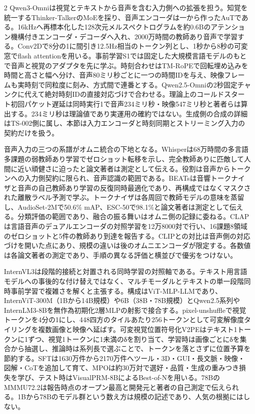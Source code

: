 \documentclass[lualatex,a4paper,10pt]{jlreq}
\begin{document}
\begin{multicols}{2}
\noindent Qwen3-Omniは視覚とテキストから音声を含む入力側への拡張を担う。知覚を統一するThinker-TalkerのMoEを採り、音声エンコーダは一から作ったAuTである。16kHzへ再標本化した128次元メルスペクトログラムを約0.6Bのアテンション機構付きエンコーダ・デコーダへ入れ、2000万時間の教師あり音声で学習する。Conv2Dで8分の1に間引き12.5Hz相当のトークン列とし、1秒から8秒の可変窓でflash attentionを用いる。事前学習S1では固定した大規模言語モデルのもとで音声と視覚のアダプタを先に学ぶ。時刻合わせはTM-RoPEで回転埋め込みを時間と高さと幅へ分け、音声80ミリ秒ごとに一つの時間IDを与え、映像フレームも実時刻で同粒度に刻み、方式間で連番とする。Qwen2.5-Omniの2秒固定チャンクに代えて絶対時刻IDの直接対応づけで合わせる。理論上のコールドスタート初回パケット遅延は同時実行1で音声234ミリ秒・映像547ミリ秒と著者らは算出する。234ミリ秒は理論値であり実運用の確約ではない。生成側の合成の詳細はTS-002側に属し、本節は入力エンコーダと時刻同期とストリーミング入力の契約だけを扱う。\autocite{vmd066}\par\medskip
\noindent 音声入力の三つの系譜がオムニ統合の下地となる。Whisperは68万時間の多言語多課題の弱教師あり学習でゼロショット転移を示し、完全教師ありに匹敵して人間に近い頑健さに迫ったと論文著者は測定として伝える。役割は音声からトークンへの入力側契約に限られ、音声認識の範囲である。BEATsは音響トークナイザと音声の自己教師あり学習の反復同時最適化であり、再構成ではなくマスクされた離散ラベル予測で学ぶ。トークナイザは各周回で教師モデルの意味を蒸留し、AudioSet-2Mで50.6\% mAP、ESC-50で98.1\%と論文著者は測定として伝える。分類評価の範囲であり、融合の振る舞いはオムニ側の記録に委ねる。CLAPは言語音声のデュアルエンコーダの対照学習を12万8000対で行い、16課題8領域のゼロショットと5件の教師あり到達を報告する。CLIPとの対比は音声側の対応づけを開いた点にあり、規模の違いは後のオムニエンコーダが限定する。各数値は各論文著者の測定であり、手順の異なる評価と横並びで優劣をつけない。\autocite{vmd067,vmd068,vmd069}\par\medskip
\noindent InternVL3は段階的接続と対置される同時学習の対照軸である。テキスト用言語モデルへの事後的な付け替えではなく、マルチモーダルとテキストの単一段階同時事前学習で複雑さを解くと主張する。構成はViT-MLP-LLMであり、InternViT-300M（1Bから14B規模）や6B（38B・78B規模）とQwen2.5系列やInternLM3-8Bを無作為初期化2層MLPの射影で接合する。pixel-unshuffleで視覚トークンを4分の1にし、448四方のタイルあたり256トークンとして可変解像度タイリングを複数画像と映像へ延ばす。可変視覚位置符号化V2PEはテキスト1トークンに1ずつ、視覚1トークンに1未満のδを割り当て、学習時は画像ごとにδを集合から抽選し、推論時は系列長で選ぶことで、トークンを落とさずに位置予算を節約する。SFTは1630万件から2170万件へツール・3D・GUI・長文脈・映像・図解・CoTを追加して育て、MPOは約30万対で選好・品質・生成の重みつき損失を学び、テスト時はVisualPRM-8BによるBest-of-Nを用いる。78BのMMMU72.2は報告時点のオープン最高と開発元と著者の自己測定で伝えられる。1Bから78Bのモデル群という数え方は規模の記述であり、人気の根拠にはしない。\autocite{vmd070}\par\medskip

\end{multicols}
\end{document}

